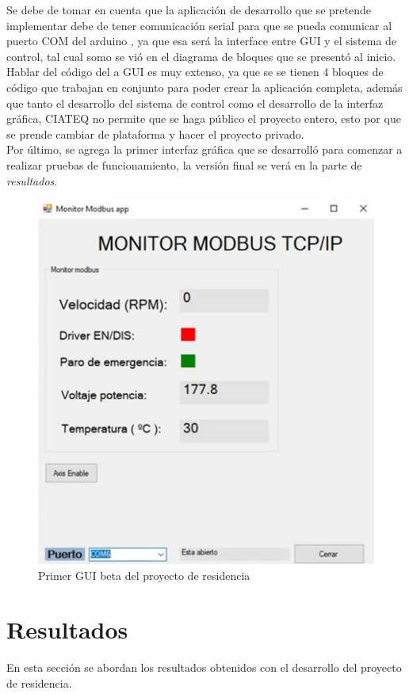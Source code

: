 \documentclass[12pt,titlepage]{article}
\begin{document}
Se debe de tomar en cuenta que la aplicación de desarrollo que se pretende implementar debe de tener comunicación serial para que se pueda comunicar al puerto COM del arduino , ya que esa será la interface entre GUI y el sistema de control, tal cual somo se vió en el diagrama de bloques que se presentó al inicio. \\

Hablar del código del a GUI es muy extenso, ya que se se tienen 4 bloques de código que trabajan en conjunto para poder crear la aplicación completa, además que tanto el desarrollo del sistema de control como el desarrollo de la interfaz gráfica, CIATEQ no permite que se haga público el proyecto entero, esto por que se prende cambiar de plataforma y hacer el proyecto privado. \\ 

Por último, se agrega la primer interfaz gráfica que se desarrolló para comenzar a realizar pruebas de funcionamiento, la versión final se verá en la parte de \textit{resultados}. \\ 

\begin{figure}[htbp]
\hspace*{4.8cm} 
\includegraphics[scale=0.64]{gui_ini}
\caption{Primer GUI beta del proyecto de residencia}
\end{figure}
\newpage
\section{Resultados}
En esta sección se abordan los resultados obtenidos con el desarrollo del proyecto de residencia. \\
\end{document}
